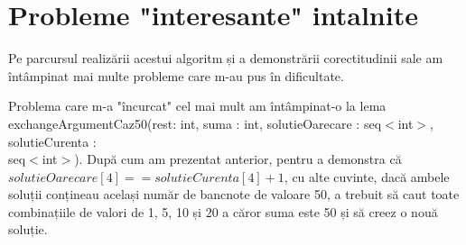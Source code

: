 \section{Probleme "interesante" intalnite}
Pe parcursul realizării acestui algoritm și a demonstrării corectitudinii sale am întâmpinat mai multe probleme care m-au pus în dificultate. \par  
Problema care m-a "încurcat" cel mai mult am întâmpinat-o la lema exchangeArgumentCaz50(rest: int, suma : int, solutieOarecare : seq$<$int$>$, solutieCurenta : \\ seq$<$int$>$). După cum am prezentat anterior, pentru a demonstra că \\ $solutieOarecare[4] == solutieCurenta[4] + 1$, cu alte cuvinte, dacă ambele soluții conțineau același număr de bancnote de valoare 50, a trebuit să caut toate combinațiile de valori de 1, 5, 10 și 20 a căror suma este 50 și să creez o nouă soluție. \par 
